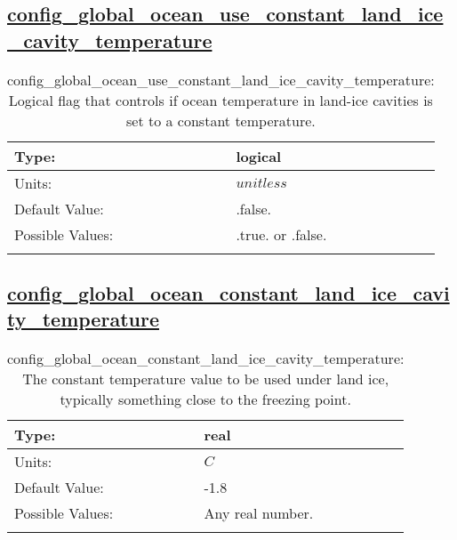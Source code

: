 \subsection[config\_global\_ocean\_use\_constant\_land\_ice\_cavity\_temperature]{\hyperref[sec:nm_tab_global_ocean]{config\_global\_ocean\_use\_constant\_land\_ice\_cavity\_temperature}}
\label{subsec:nm_sec_config_global_ocean_use_constant_land_ice_cavity_temperature}
\begin{center}
\begin{longtable}{| p{2.0in} || p{4.0in} |}
    \hline
    Type: & logical \\
    \hline
    Units: & $unitless$ \\
    \hline
    Default Value: & .false. \\
    \hline
    Possible Values: & .true. or .false. \\
    \hline
    \caption{config\_global\_ocean\_use\_constant\_land\_ice\_cavity\_temperature: Logical flag that controls if ocean temperature in land-ice cavities is set to a constant temperature.}
\end{longtable}
\end{center}
\subsection[config\_global\_ocean\_constant\_land\_ice\_cavity\_temperature]{\hyperref[sec:nm_tab_global_ocean]{config\_global\_ocean\_constant\_land\_ice\_cavity\_temperature}}
\label{subsec:nm_sec_config_global_ocean_constant_land_ice_cavity_temperature}
\begin{center}
\begin{longtable}{| p{2.0in} || p{4.0in} |}
    \hline
    Type: & real \\
    \hline
    Units: & $C$ \\
    \hline
    Default Value: & -1.8 \\
    \hline
    Possible Values: & Any real number. \\
    \hline
    \caption{config\_global\_ocean\_constant\_land\_ice\_cavity\_temperature: The constant temperature value to be used under land ice, typically something close to the freezing point.}
\end{longtable}
\end{center}
